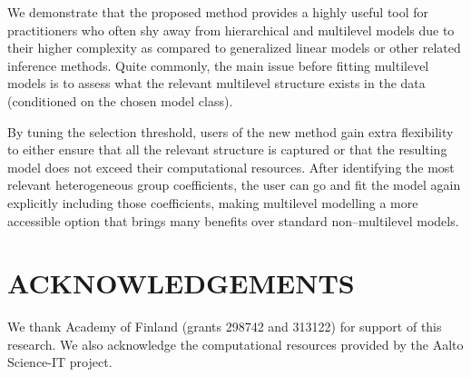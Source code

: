 \documentclass{article}
\begin{document}
We demonstrate that the proposed method provides a highly useful tool for practitioners who often shy away from hierarchical and multilevel models due to their higher complexity as compared to generalized linear models or other related inference methods.
Quite commonly, the main issue before fitting multilevel models is to assess what the relevant multilevel structure exists in the data (conditioned on the chosen model class).

By tuning the selection threshold, users of the new method gain extra flexibility to either ensure that all the relevant structure is captured or that the resulting model does not exceed their computational resources. 
After identifying the most relevant heterogeneous group coefficients, the user can go and fit the model again explicitly including those coefficients, making multilevel modelling a more accessible option that brings many benefits over standard non--multilevel models.

%
%
%
%

\section{ACKNOWLEDGEMENTS}

We thank Academy of Finland (grants 298742 and 313122) for support of this research.
We also acknowledge the computational resources provided by the Aalto Science-IT project.


%
%
%
%


\end{document}
